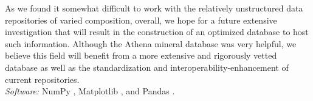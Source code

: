 \documentclass[]{aastex63}
\begin{document}
As we found it somewhat difficult to work with the relatively unstructured data repositories of varied composition, overall, we hope for a future extensive investigation that will result in the construction of an optimized database to host such information. Although the Athena mineral database was very helpful, we believe this field will benefit from a more extensive and rigorously vetted database as well as the standardization and interoperability-enhancement of current repositories.  \\

\textit{Software:} NumPy \citep{harris2020}, Matplotlib \citep{hunter2007}, and Pandas \citep{McKinney2009}. 


\end{document}
